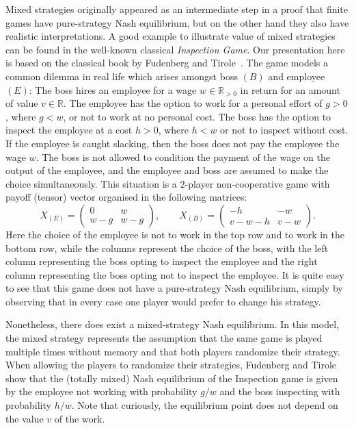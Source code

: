 \documentclass[a4paper,11pt,reqno,english]{amsart}
\theoremstyle{plain}
\theoremstyle{definition}
\begin{document}
\medskip
Mixed strategies originally appeared as an intermediate step in a proof that  finite games have pure-strategy Nash equilibrium, but on the other hand they also have realistic interpretations.
A good example to illustrate value of mixed strategies can be found in the well-known classical \textit{Inspection Game}.
Our presentation here is based on the classical book by Fudenberg and Tirole~\cite[Ex.\,1.7]{FudenbergTirole1991}.
The game models a common dilemma in real life which arises amongst boss $(B)$ and employee $(E)$: The boss hires an employee for a wage $w\in\mathbb{R}_{>0}$ in return for an amount of value $v\in\mathbb{R}$.
The employee has the option to work for a personal effort of $g>0$, where $g < w$, or not to work at no personal cost.
The boss has the option to inspect the employee at a cost $h>0$, where $h < w$ or not to inspect without cost.
If the employee is caught slacking, then the boss does not pay the employee the wage $w$.
The boss is not allowed to condition the payment of the wage on the output of the employee, and the employee and boss are assumed to make the choice simultaneously.
This situation is a $2$-player non-cooperative game with payoff (tensor) vector organised in the following matrices:
\begin{displaymath}
	X_{(E)} = \begin{pmatrix}
		0     & w     \\
		w - g & w - g
	\end{pmatrix}, \qquad X_{(B)} = \begin{pmatrix}
		-h    & -w  \\
		v-w-h & v-w
	\end{pmatrix}.
\end{displaymath}
Here the choice of the employee is not to work in the top row and to work in the bottom row, while the columns represent the choice of the boss, with the left column representing the boss opting to inspect the employee and the right column representing the boss opting not to inspect the employee.
It is quite easy to see that this game does not have a pure-strategy Nash equilibrium, simply by observing that in every case one player would prefer to change his strategy.

\medskip
Nonetheless, there does exist a mixed-strategy Nash equilibrium.
In this model, the mixed strategy represents the assumption that the same game is played multiple times without memory and that both players randomize their strategy.
When allowing the players to randomize their strategies, Fudenberg and Tirole show that the (totally mixed) Nash equilibrium of the Inspection game is given by the employee not working with probability $g/w$ and the boss inspecting with probability $h/w$.
Note that curiously, the equilibrium point does not depend on the value $v$ of the work.
\end{document}
